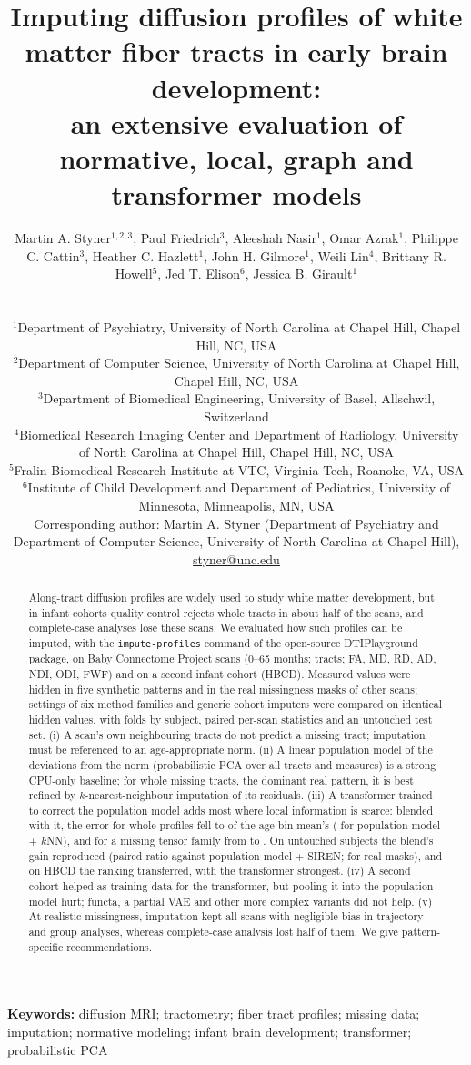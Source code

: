 \documentclass[11pt]{article}
\title{Imputing diffusion profiles of white matter fiber tracts in early brain development:\\
\large an extensive evaluation of normative, local, graph and transformer models}
\author{\parbox{0.95\textwidth}{\centering Martin A. Styner$^{1,2,3}$, Paul Friedrich$^{3}$, Aleeshah Nasir$^{1}$, Omar Azrak$^{1}$, Philippe C. Cattin$^{3}$, Heather C. Hazlett$^{1}$, John H. Gilmore$^{1}$, Weili Lin$^{4}$, Brittany R. Howell$^{5}$, Jed T. Elison$^{6}$, Jessica B. Girault$^{1}$}\\[4pt]
\parbox{0.92\textwidth}{\raggedright\small
$^{1}$Department of Psychiatry, University of North Carolina at Chapel Hill, Chapel Hill, NC, USA\\
$^{2}$Department of Computer Science, University of North Carolina at Chapel Hill, Chapel Hill, NC, USA\\
$^{3}$Department of Biomedical Engineering, University of Basel, Allschwil, Switzerland\\
$^{4}$Biomedical Research Imaging Center and Department of Radiology, University of North Carolina at Chapel Hill, Chapel
Hill, NC, USA\\
$^{5}$Fralin Biomedical Research Institute at VTC, Virginia Tech, Roanoke, VA, USA\\
$^{6}$Institute of Child Development and Department of Pediatrics, University of Minnesota, Minneapolis, MN, USA\\[3pt]
Corresponding author: Martin A. Styner (Department of Psychiatry and Department of Computer Science, University of North
Carolina at Chapel Hill), \href{mailto:styner@unc.edu}{styner@unc.edu}}}
\date{}
\begin{document}
\maketitle

\begin{abstract}
\noindent Along-tract diffusion profiles are widely used to study white matter development, but in infant cohorts
quality control rejects whole tracts in about half of the scans, and complete-case analyses lose these scans. We
evaluated how such profiles can be imputed, with the \texttt{impute-profiles} command of the open-source DTIPlayground
package, on \bcpscans{} Baby Connectome Project scans (0--65 months; \bcptracts{} tracts; FA, MD, RD, AD, NDI, ODI, FWF)
and on a second infant cohort (HBCD). Measured values were hidden in five synthetic patterns and in the real missingness
masks of other scans; \nSettingsValidated{} settings of six method families and generic cohort imputers were compared on
identical hidden values, with folds by subject, paired per-scan statistics and an untouched test set. (i) A scan's own
neighbouring tracts do not predict a missing tract; imputation must be referenced to an age-appropriate norm.
(ii) A linear population model of the deviations from the norm (probabilistic PCA over all tracts and measures) is a
strong CPU-only baseline; for whole missing tracts, the dominant real pattern, it is best refined by $k$-nearest-neighbour
imputation of its residuals. (iii) A transformer trained to correct the population model adds most where local
information is scarce: blended with it, the error for whole profiles fell to \rFinalWhole{} of the age-bin mean's
(\rPpcaKnnWhole{} for population model + $k$NN), and for a missing tensor family from \rPpcaWdti{} to \rFinalWdti.
On untouched subjects the blend's gain reproduced (paired ratio \eOneFinalVsDef{} against population model + SIREN;
\eOneFinalVsDefReal{} for real masks), and on HBCD the ranking transferred, with the transformer strongest.
(iv) A second cohort helped as training data for the transformer, but pooling it into the population model hurt; functa,
a partial VAE and other more complex variants did not help. (v) At realistic missingness, imputation kept all scans with
negligible bias in trajectory and group analyses, whereas complete-case analysis lost half of them. We give
pattern-specific recommendations.
\end{abstract}

\noindent\textbf{Keywords:} diffusion MRI; tractometry; fiber tract profiles; missing data; imputation; normative
modeling; infant brain development; transformer; probabilistic PCA
\end{document}
